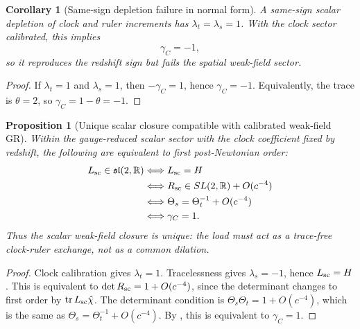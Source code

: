 \documentclass[11pt]{article}
\newtheorem{proposition}[theorem]{Proposition}
\newtheorem{corollary}[theorem]{Corollary}
\theoremstyle{remark}
\begin{document}
\begin{corollary}[Same-sign depletion failure in normal form]
\label{cor:same-sign-failure-normal-form}
A same-sign scalar depletion of clock and ruler increments has \(\lambda_t=\lambda_s=1\).  With the clock sector calibrated, this implies
\[
        \gamma_C=-1,
\]
so it reproduces the redshift sign but fails the spatial weak-field sector.
\end{corollary}

\begin{proof}
If \(\lambda_t=1\) and \(\lambda_s=1\), then \(-\gamma_C=1\), hence \(\gamma_C=-1\).  Equivalently, the trace is \(\theta=2\), so \(\gamma_C=1-\theta=-1\).
\end{proof}

\begin{proposition}[Unique scalar closure compatible with calibrated weak-field GR]
\label{prop:unique-scalar-closure}
Within the gauge-reduced scalar sector with the clock coefficient fixed by redshift, the following are equivalent to first post-Newtonian order:
\[
\begin{aligned}
        L_{\rm sc}\in\mathfrak{sl}(2,\mathbb R)
        &\Longleftrightarrow
        L_{\rm sc}=H \\
        &\Longleftrightarrow
        R_{\rm sc}\in SL(2,\mathbb R)+O(c^{-4}) \\
        &\Longleftrightarrow
        \Theta_s=\Theta_t^{-1}+O(c^{-4}) \\
        &\Longleftrightarrow
        \gamma_C=1.
\end{aligned}
\]
Thus the scalar weak-field closure is unique: the load must act as a trace-free clock-ruler exchange, not as a common dilation.
\end{proposition}

\begin{proof}
Clock calibration gives \(\lambda_t=1\).  Tracelessness gives \(\lambda_s=-1\), hence \(L_{\rm sc}=H\).  This is equivalent to \(\det R_{\rm sc}=1+O(c^{-4})\), since the determinant changes to first order by \(\operatorname{tr}L_{\rm sc}\hat\chi\).  The determinant condition is \(\Theta_s\Theta_t=1+O(c^{-4})\), which is the same as \(\Theta_s=\Theta_t^{-1}+O(c^{-4})\).  By , this is equivalent to \(\gamma_C=1\).
\end{proof}
\end{document}
